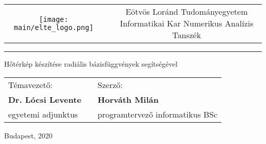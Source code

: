 \documentclass[12pt]{report}
\theoremstyle{plain}
\theoremstyle{definition}
\begin{document}
	

\begin{titlepage}
	\vspace*{0cm}
	\centering
	\begin{tabular}{cp{1cm}c}
		\begin{minipage}{4cm}
			\vspace{0pt}
			\texttt{[image: main/elte\_logo.png]}
		\end{minipage} & &
		\begin{minipage}{7cm}
			\vspace{0pt}Eötvös Loránd Tudományegyetem \vspace{10pt} \newline
			Informatikai Kar \vspace{10pt} \newline
			Numerikus Analízis Tanszék
		\end{minipage}
	\end{tabular}
	
	\vspace*{0.2cm}
	\rule{\textwidth}{1pt}
	
	\vspace*{5cm}
	{\Huge Hőtérkép készítése radiális bázisfüggvények segítségével }
	

	
	\vspace*{9cm}
	
	\begin{tabular}{lp{5cm}l}
		Témavezető: & & Szerző: \\
		\textbf{Dr. Lócsi Levente}  & &  \textbf{Horváth Milán} \\
		egyetemi adjunktus & & programtervező informatikus BSc
	\end{tabular}
	
	\vfill
	
	\vspace*{1cm}
	Budapest, 2020
\end{titlepage}
\thispagestyle{empty}
\onehalfspacing
\tableofcontents
\newpage
	
	
	
	
	
	
	
\end{document}
